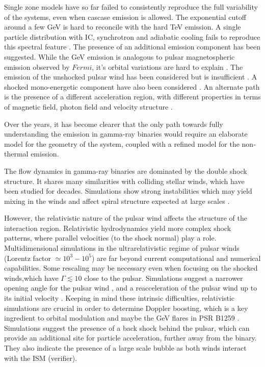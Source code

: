 

 Single zone models have so far failed to consistently reproduce the full variability of the systems, even when cascase emission is allowed. The exponential cutoff around a few GeV is hard to reconcile with the hard TeV emission. A single particle distribution with IC, synchrotron  and adiabatic  cooling fails to reproduce  this spectral feature \citep{2008MNRAS.383..467K, 2013A&A...551A..17Z}.   The presence of an additional emission component has been suggested. While the GeV emission  is analogous to  pulsar magnetospheric emission observed by $Fermi$, it's orbital variations are hard to explain \citep{2012ApJ...749...54H}.   The emission of the unshocked pulsar wind \citep{2007MNRAS.380..320K}   has been considered but is insufficient \citep{2008APh....30..239S}.  A shocked mono-energetic  component have also been considered \citep{2013A&A...557A.127D}.  An alternate path is the presence of a different acceleration region, with different properties in terms of magnetic field, photon field and velocity structure \citep{2013A&A...551A..17Z}.

Over the years, it has become clearer that the only path towards fully understanding the emission in gamma-ray binaries would require an elaborate model for the geometry of the system, coupled with a refined model for the non-thermal emission. 

The flow dynamics in gamma-ray binaries are dominated by the double shock structure. It  shares many similarities with colliding stellar winds, which have been studied for decades. Simulations \citep{2009MNRAS.396.1743P,2011MNRAS.418.2618L} show strong instabilities which may  yield mixing in the winds \citep{2010MNRAS.403.1873Z}  and affect spiral structure expected at large scales \citep{2012A&A...546A..60L,2012A&A...544A..59B}.  

However, the relativistic nature of the pulsar wind affects the structure of the interaction region. Relativistic hydrodynamics yield more complex shock patterns, where parallel velocities (to the shock normal) play a role. Multidimensional simulations in the  ultrarelativistic regime of pulsar winds (Lorentz factor $\simeq 10^3-10^5$) are far beyond current computational and numerical capabilities. Some rescaling may be necessary even when focusing on the shocked winds,which have $\Gamma\lesssim 10$ close to the pulsar.  Simulations suggest a narrower opening angle for the pulsar wind \citep{2013A&A...560A..79L}, and a reacceleration of the pulsar wind up to its initial velocity \citep{2008MNRAS.387...63B}. Keeping in mind these intrinsic difficulties, relativistic simulations are crucial in order to determine Doppler boosting, which is a key ingredient to orbital modulation and maybe the GeV flares in PSR B1259 \citep{2012ApJ...753..127K}. Simulations suggest the presence of a back shock behind the pulsar, which can provide an additional site for particle acceleration, further away from the binary. They also indicate the presence of a large scale bubble as both winds interact with the ISM (verifier).





